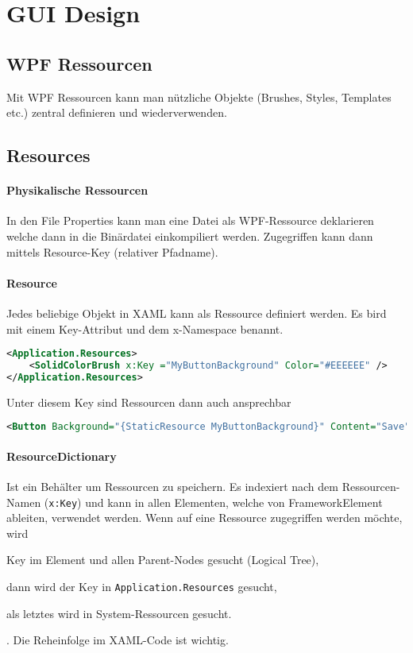 \section{GUI Design}
\subsection{WPF Ressourcen}
Mit WPF Ressourcen kann man nützliche Objekte (Brushes, Styles, Templates etc.) zentral definieren und wiederverwenden.
\subsection{Resources}
\paragraph{Physikalische Ressourcen} In den File Properties kann man eine Datei als WPF-Ressource deklarieren welche dann in die Binärdatei einkompiliert werden. Zugegriffen kann dann mittels Resource-Key (relativer Pfadname).
\paragraph{Resource} Jedes beliebige Objekt in XAML kann als Ressource definiert werden. Es bird mit einem Key-Attribut und dem x-Namespace benannt.
\begin{lstlisting}[language=xml]
<Application.Resources>
    <SolidColorBrush x:Key ="MyButtonBackground" Color="#EEEEEE" />
</Application.Resources>
\end{lstlisting}
Unter diesem Key sind Ressourcen dann auch ansprechbar
\begin{lstlisting}[language=xml]
<Button Background="{StaticResource MyButtonBackground}" Content="Save" />
\end{lstlisting}
\paragraph{ResourceDictionary} Ist ein Behälter um Ressourcen zu speichern. Es indexiert nach dem Ressourcen-Namen (\verb+x:Key+) und kann in allen Elementen, welche von FrameworkElement ableiten, verwendet werden. Wenn auf eine Ressource zugegriffen werden möchte, wird \begin{enumerate*}[label=\itshape \arabic*\upshape.]\item Key im Element und allen Parent-Nodes gesucht (Logical Tree), \item dann wird der Key in \verb+Application.Resources+ gesucht, \item als letztes wird in System-Ressourcen gesucht.\end{enumerate*}. Die Reheinfolge im XAML-Code ist wichtig.
